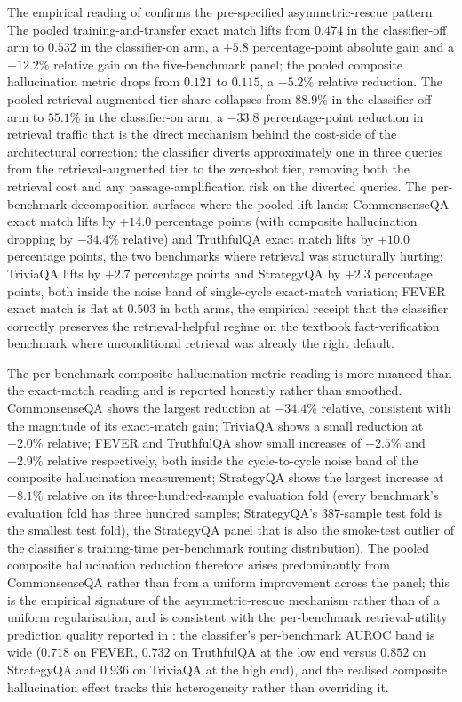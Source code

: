 The empirical reading of  confirms the pre-specified asymmetric-rescue pattern. The pooled training-and-transfer exact match lifts from $0.474$ in the classifier-off arm to $0.532$ in the classifier-on arm, a $+5.8$ percentage-point absolute gain and a $+12.2\%$ relative gain on the five-benchmark panel; the pooled composite hallucination metric drops from $0.121$ to $0.115$, a $-5.2\%$ relative reduction. The pooled retrieval-augmented tier share collapses from $88.9\%$ in the classifier-off arm to $55.1\%$ in the classifier-on arm, a $-33.8$ percentage-point reduction in retrieval traffic that is the direct mechanism behind the cost-side of the architectural correction: the classifier diverts approximately one in three queries from the retrieval-augmented tier to the zero-shot tier, removing both the retrieval cost and any passage-amplification risk on the diverted queries. The per-benchmark decomposition surfaces where the pooled lift lands: CommonsenseQA exact match lifts by $+14.0$ percentage points (with composite hallucination dropping by $-34.4\%$ relative) and TruthfulQA exact match lifts by $+10.0$ percentage points, the two benchmarks where retrieval was structurally hurting; TriviaQA lifts by $+2.7$ percentage points and StrategyQA by $+2.3$ percentage points, both inside the noise band of single-cycle exact-match variation; FEVER exact match is flat at $0.503$ in both arms, the empirical receipt that the classifier correctly preserves the retrieval-helpful regime on the textbook fact-verification benchmark where unconditional retrieval was already the right default.

The per-benchmark composite hallucination metric reading is more nuanced than the exact-match reading and is reported honestly rather than smoothed. CommonsenseQA shows the largest reduction at $-34.4\%$ relative, consistent with the magnitude of its exact-match gain; TriviaQA shows a small reduction at $-2.0\%$ relative; FEVER and TruthfulQA show small increases of $+2.5\%$ and $+2.9\%$ relative respectively, both inside the cycle-to-cycle noise band of the composite hallucination measurement; StrategyQA shows the largest increase at $+8.1\%$ relative on its three-hundred-sample evaluation fold (every benchmark's evaluation fold has three hundred samples; StrategyQA's $387$-sample test fold is the smallest test fold), the StrategyQA panel that is also the smoke-test outlier of the classifier's training-time per-benchmark routing distribution). The pooled composite hallucination reduction therefore arises predominantly from CommonsenseQA rather than from a uniform improvement across the panel; this is the empirical signature of the asymmetric-rescue mechanism rather than of a uniform regularisation, and is consistent with the per-benchmark retrieval-utility prediction quality reported in : the classifier's per-benchmark AUROC band is wide ($0.718$ on FEVER, $0.732$ on TruthfulQA at the low end versus $0.852$ on StrategyQA and $0.936$ on TriviaQA at the high end), and the realised composite hallucination effect tracks this heterogeneity rather than overriding it.

